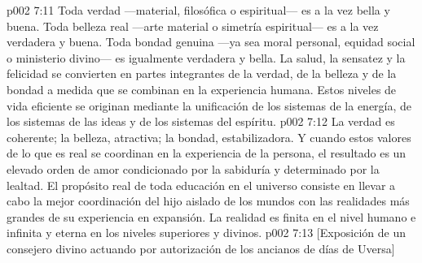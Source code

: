 \vs p002 7:11 \pc Toda verdad ---material, filosófica o espiritual--- es a la vez bella y buena. Toda belleza real ---arte material o simetría espiritual--- es a la vez verdadera y buena. Toda bondad genuina ---ya sea moral personal, equidad social o ministerio divino--- es igualmente verdadera y bella. La salud, la sensatez y la felicidad se convierten en partes integrantes de la verdad, de la belleza y de la bondad a medida que se combinan en la experiencia humana. Estos niveles de vida eficiente se originan mediante la unificación de los sistemas de la energía, de los sistemas de las ideas y de los sistemas del espíritu.
\vs p002 7:12 La verdad es coherente; la belleza, atractiva; la bondad, estabilizadora. Y cuando estos valores de lo que es real se coordinan en la experiencia de la persona, el resultado es un elevado orden de amor condicionado por la sabiduría y determinado por la lealtad. El propósito real de toda educación en el universo consiste en llevar a cabo la mejor coordinación del hijo aislado de los mundos con las realidades más grandes de su experiencia en expansión. La realidad es finita en el nivel humano e infinita y eterna en los niveles superiores y divinos.
\vsetoff
\vs p002 7:13 [Exposición de un consejero divino actuando por autorización de los ancianos de días de Uversa]
